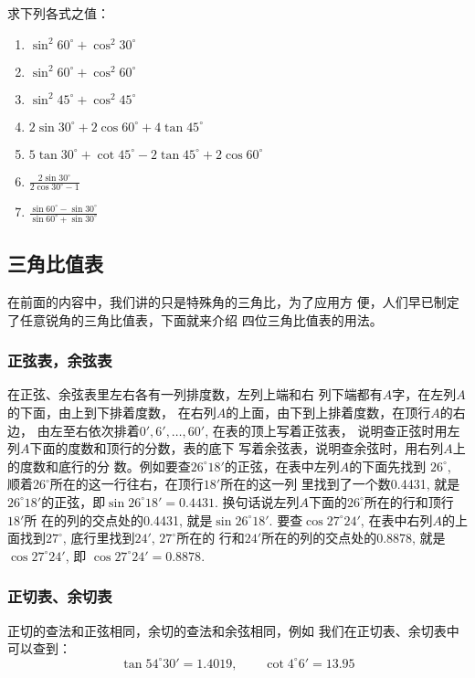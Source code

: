 \begin{ex}
    求下列各式之值：
\begin{enumerate}
\item $\sin^2 60^{\circ}+\cos^2 30^{\circ}$
\item $\sin^2 60^{\circ}+\cos^2 60^{\circ}$
\item $\sin^2 45^{\circ}+\cos^2 45^{\circ}$
\item $2\sin30^{\circ}+2\cos60^{\circ}+4\tan 45^{\circ}$
\item $5\tan 30^{\circ}+\cot 45^{\circ}-2\tan 45^{\circ}+2\cos 60^{\circ}$  
\item $\frac{2\sin30^{\circ}}{2\cos30^{\circ}-1}$
\item $\frac{\sin60^{\circ}-\sin30^{\circ}}{\sin60^{\circ}+\sin30^{\circ}}$
\end{enumerate}
\end{ex}

\subsection{三角比值表}
在前面的内容中，我们讲的只是特殊角的三角比，为了应用方
便，人们早已制定了任意锐角的三角比值表，下面就来介绍
四位三角比值表的用法。

\subsubsection{正弦表，余弦表}
在正弦、余弦表里左右各有一列排度数，左列上端和右
列下端都有$A$字，在左列$A$的下面，由上到下排着度数，
在右列$A$的上面，由下到上排着度数，在顶行$A$的右边，
由左至右依次排着$0',6',\ldots,60'$, 在表的顶上写着正弦表，
说明查正弦时用左列$A$下面的度数和顶行的分数，表的底下
写着余弦表，说明查余弦时，用右列$A$上的度数和底行的分
数。例如要查$26^{\circ}18'$的正弦，在表中左列$A$的下面先找到
$26^{\circ}$, 顺着$26^{\circ}$所在的这一行往右，在顶行$18'$所在的这一列
里找到了一个数0.4431, 就是$26^{\circ}18'$的正弦，即$\sin26^{\circ}18'=
0.4431$. 换句话说左列$A$下面的$26^{\circ}$所在的行和顶行$18'$所
在的列的交点处的0.4431, 就是$\sin26^{\circ}18'$. 要查$\cos27^{\circ}24'$, 
在表中右列$A$的上面找到$27^{\circ}$, 底行里找到$24'$, $27^{\circ}$所在的
行和$24'$所在的列的交点处的0.8878, 就是$\cos27^{\circ}24'$, 即
$\cos27^{\circ}24'=0.8878$.

\subsubsection{正切表、余切表}
正切的查法和正弦相同，余切的查法和余弦相同，例如
我们在正切表、余切表中可以查到：
\[\tan 54^{\circ}30'=1.4019,\qquad \cot 4^{\circ}6'=13.95\]

